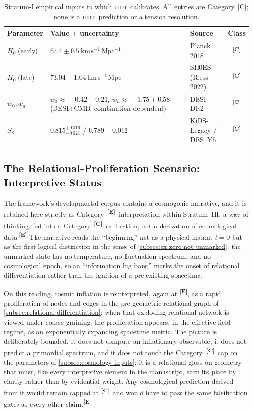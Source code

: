 \documentclass[12pt,a4paper,twoside]{article}
\theoremstyle{plain}
\theoremstyle{definition}
\theoremstyle{remark}
\newcommand{\UIDT}{\textsc{uidt}}
\newcommand{\catmark}[1]{\textsuperscript{\textsf{\textbf{[#1]}}}}
\begin{document}
\begin{table}[H]
\centering
\footnotesize
\caption{Stratum-I empirical inputs to which \UIDT\ calibrates. All entries are
Category~[C]; none is a \UIDT\ prediction or a tension resolution.}
\label{tab:cosmology-inputs}
\renewcommand{\arraystretch}{1.3}
\begin{tabular}{p{} p{} p{} c}
\toprule
\textbf{Parameter} & \textbf{Value $\pm$ uncertainty} & \textbf{Source} & \textbf{Class} \\
\midrule
$H_0$ (early) & $67.4 \pm 0.5\ \mathrm{km\,s^{-1}\,Mpc^{-1}}$ & Planck 2018 & \catmark{C} \\
$H_0$ (late) & $73.04 \pm 1.04\ \mathrm{km\,s^{-1}\,Mpc^{-1}}$ & SH0ES (Riess 2022) & \catmark{C} \\
$w_0, w_a$ & $w_0\!\approx\!-0.42\pm0.21,\ w_a\!\approx\!-1.75\pm0.58$ (DESI+CMB; combination-dependent) & DESI DR2 & \catmark{C} \\
$S_8$ & $0.815^{+0.016}_{-0.021}$ / $0.789\pm0.012$ & KiDS-Legacy / DES~Y6 & \catmark{C} \\
\bottomrule
\end{tabular}
\end{table}

\subsection{The Relational-Proliferation Scenario: Interpretive Status}
\label{subsec:information-big-bang}

The framework's developmental corpus contains a cosmogonic narrative, and it is retained here strictly as Category~\catmark{E}\ interpretation within Stratum~III, a way of thinking, fed into a Category~\catmark{C}\ calibration, not a derivation of cosmological data.\catmark{E} The narrative reads the ``beginning'' not as a physical instant $t=0$ but as the first logical distinction in the sense of \cref{subsec:sx-zero-not-unmarked}: the unmarked state has no temperature, no fluctuation spectrum, and no cosmological epoch, so an ``information big bang'' marks the onset of relational differentiation rather than the ignition of a pre-existing spacetime.

On this reading, cosmic inflation is reinterpreted, again at \catmark{E}, as a rapid proliferation of nodes and edges in the pre-geometric relational graph of \cref{subsec:relational-differentiation}: when that exploding relational network is viewed under coarse-graining, the proliferation appears, in the effective field regime, as an exponentially expanding spacetime metric. The picture is deliberately bounded. It does not compute an inflationary observable, it does not predict a primordial spectrum, and it does not touch the Category~\catmark{C}\ cap on the parameters of \cref{subsec:cosmology-inputs}; it is a relational gloss on geometry that must, like every interpretive element in the manuscript, earn its place by clarity rather than by evidential weight. Any cosmological prediction derived from it would remain capped at \catmark{C}\ and would have to pass the same falsification gates as every other claim.\catmark{E}
\end{document}
